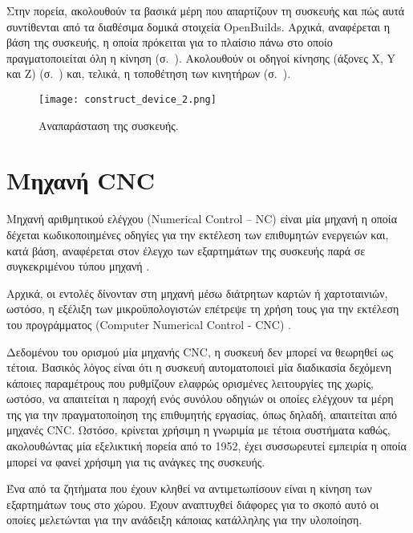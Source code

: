 Στην πορεία, ακολουθούν τα βασικά μέρη που απαρτίζουν τη συσκευής και πώς αυτά
συντίθενται από τα διαθέσιμα δομικά στοιχεία OpenBuilds. Αρχικά, αναφέρεται η
βάση της συσκευής, η οποία πρόκειται για το πλαίσιο πάνω στο οποίο
πραγματοποιείται όλη η κίνηση (σ.~\pageref{sec:construct:base}). Ακολουθούν οι
οδηγοί κίνησης (άξονες X, Y και Z) (σ.~\pageref{sec:construct:axes}) και,
τελικά, η τοποθέτηση των κινητήρων (σ.~\pageref{sec:construct:motors}).

\begin{figure}
    \caption{Αναπαράσταση της συσκευής.\label{fig:construct:device}}
    \begin{center}%
    \texttt{[image: construct\_device\_2.png]}
    \end{center}
\end{figure}

\section{Μηχανή CNC}

Μηχανή αριθμητικού ελέγχου (Numerical Control -- NC) είναι μία μηχανή η οποία δέχεται κωδικοποιημένες οδηγίες για την
εκτέλεση των επιθυμητών ενεργειών και, κατά βάση, αναφέρεται στον έλεγχο των
εξαρτημάτων της συσκευής παρά σε συγκεκριμένου τύπου μηχανή
\parencites{seames01}{albert11}.

Αρχικά, οι εντολές δίνονταν στη μηχανή μέσω διάτρητων καρτών ή χαρτοταινιών,
ωστόσο, η εξέλιξη των μικροϋπολογιστών επέτρεψε τη χρήση τους για την εκτέλεση
του προγράμματος (Computer Numerical Control - CNC) \parencite{seames01}.

Δεδομένου του ορισμού μία μηχανής CNC, η συσκευή δεν μπορεί να θεωρηθεί ως
τέτοια. Βασικός λόγος είναι ότι η συσκευή αυτοματοποιεί μία διαδικασία δεχόμενη
κάποιες παραμέτρους που ρυθμίζουν ελαφρώς ορισμένες λειτουργίες της χωρίς,
ωστόσο, να απαιτείται η παροχή ενός συνόλου οδηγιών οι οποίες ελέγχουν τα μέρη
της για την πραγματοποίηση της επιθυμητής εργασίας, όπως δηλαδή, απαιτείται από
μηχανές CNC.
Ωστόσο, κρίνεται χρήσιμη η γνωριμία με τέτοια συστήματα καθώς, ακολουθώντας μία
εξελικτική πορεία από το 1952, έχει συσσωρευτεί εμπειρία η οποία μπορεί να φανεί
χρήσιμη για τις ανάγκες της συσκευής.

Ένα από τα ζητήματα που έχουν κληθεί να αντιμετωπίσουν είναι η κίνηση των
εξαρτημάτων τους στο χώρου. Έχουν αναπτυχθεί διάφορες για το σκοπό αυτό οι
οποίες μελετώνται για την ανάδειξη κάποιας κατάλληλης για την υλοποίηση.


